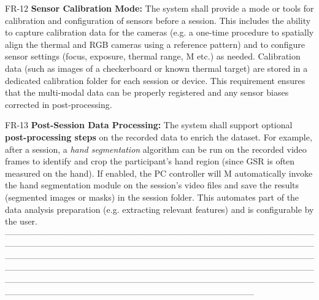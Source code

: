   FR-12                   \textbf{Sensor Calibration Mode:} The system shall provide a mode or tools for calibration and configuration of sensors before a session. This includes the ability to capture calibration data for the cameras (e.g. a one-time procedure to spatially align the thermal and RGB cameras using a reference pattern) and to configure sensor settings (focus, exposure, thermal range,  M
                          etc.) as needed. Calibration data (such as images of a checkerboard or known thermal target) are stored in a dedicated calibration folder for each session or                                                                                                                                                                                                                      
                          device\cite{StressDefinitionHH}\cite{CortisolStressIndicator2020}.   
                          This requirement ensures that the multi-modal data can be properly registered and any sensor biases corrected in post-processing.                                                                                                                                                                                                                                                  

  FR-13                   \textbf{Post-Session Data Processing:} The system shall support optional \textbf{post-processing steps} on the recorded data to enrich the dataset. For example, after a session, a \textit{hand segmentation} algorithm can be run on the recorded video frames to identify and crop the participant's hand region (since GSR is often measured on the hand). If enabled, the PC controller will   M
                          automatically invoke the hand segmentation module on the session's video files and save the results (segmented images or masks) in the session folder\cite{WHOStressDefinition}. This automates part of the data analysis preparation (e.g. extracting relevant 
                          features) and is configurable by the user.                                                                                                                                                                                                                                                                                                                                         
  ---------------------------------------------------------------------------------------------------------------------------------------------------------------------------------------------------------------------------------------------------------------------------------------------------------------------------------------------------------------------------------------------------------------------------------------------------------------------------------------------------------------------------------------------------------------------------------------------------------------------------------------------------

